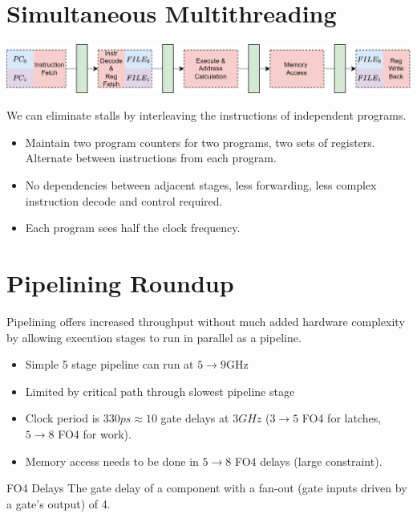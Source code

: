 \section{Simultaneous Multithreading}
\begin{center}
	\includegraphics[width=.9\textwidth]{pipelining/images/simultaneous_multithreading.drawio.png}
\end{center}
We can eliminate stalls by interleaving the instructions of independent programs.
\begin{itemize}
	\item Maintain two program counters for two programs, two sets of registers. Alternate between instructions from each program.
	\item No dependencies between adjacent stages, less forwarding, less complex instruction decode and control required.
	\item Each program sees half the clock frequency.
\end{itemize}

\section{Pipelining Roundup}
Pipelining offers increased throughput without much added hardware complexity by allowing execution stages to run in parallel as a pipeline.
\begin{itemize}
	\item Simple 5 stage pipeline can run at $5 \to 9$GHz
	\item Limited by critical path through slowest pipeline stage
	\item Clock period is $330ps \approx 10$ gate delays at $3GHz$ ($3 \to 5$ FO4 for latches, $5\to8$ FO4 for work).
	\item Memory access needs to be done in $5\to8$ FO4 delays (large constraint).
\end{itemize}

\begin{sidenotebox}{FO4 Delays}
	The gate delay of a component with a fan-out (gate inputs driven by a gate's output) of 4.
\end{sidenotebox}